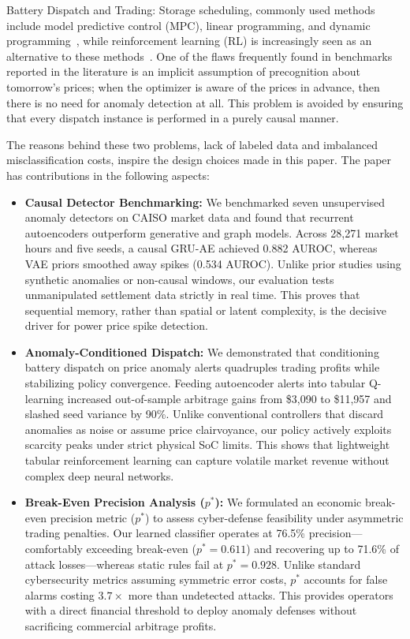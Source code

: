 \documentclass[journal]{IEEEtran}
\begin{document}
Battery Dispatch and Trading: Storage scheduling, commonly used methods include model predictive control (MPC), linear programming, and dynamic programming~\cite{Shi_BESS_Coopt}, while reinforcement learning (RL) is increasingly seen as an alternative to these methods~\cite{RL_Dispatch, Chen_DRL_BESS, Sutton_RL}. One of the flaws frequently found in benchmarks reported in the literature is an implicit assumption of precognition about tomorrow's prices; when the optimizer is aware of the prices in advance, then there is no need for anomaly detection at all. This problem is avoided by ensuring that every dispatch instance is performed in a purely causal manner.

The reasons behind these two problems, lack of labeled data and imbalanced misclassification costs, inspire the design choices made in this paper. The paper has contributions in the following aspects:
\begin{itemize}
\item \textbf{Causal Detector Benchmarking:} We benchmarked seven unsupervised anomaly detectors on CAISO market data and found that recurrent autoencoders outperform generative and graph models. Across 28,271 market hours and five seeds, a causal GRU-AE achieved 0.882 AUROC, whereas VAE priors smoothed away spikes (0.534 AUROC). Unlike prior studies using synthetic anomalies or non-causal windows, our evaluation tests unmanipulated settlement data strictly in real time. This proves that sequential memory, rather than spatial or latent complexity, is the decisive driver for power price spike detection.
\item \textbf{Anomaly-Conditioned Dispatch:} We demonstrated that conditioning battery dispatch on price anomaly alerts quadruples trading profits while stabilizing policy convergence. Feeding autoencoder alerts into tabular Q-learning increased out-of-sample arbitrage gains from \$3,090 to \$11,957 and slashed seed variance by 90\%. Unlike conventional controllers that discard anomalies as noise or assume price clairvoyance, our policy actively exploits scarcity peaks under strict physical SoC limits. This shows that lightweight tabular reinforcement learning can capture volatile market revenue without complex deep neural networks.
\item \textbf{Break-Even Precision Analysis ($p^*$):} We formulated an economic break-even precision metric ($p^*$) to assess cyber-defense feasibility under asymmetric trading penalties. Our learned classifier operates at 76.5\% precision—comfortably exceeding break-even ($p^* = 0.611$) and recovering up to 71.6\% of attack losses—whereas static rules fail at $p^* = 0.928$. Unlike standard cybersecurity metrics assuming symmetric error costs, $p^*$ accounts for false alarms costing $3.7\times$ more than undetected attacks. This provides operators with a direct financial threshold to deploy anomaly defenses without sacrificing commercial arbitrage profits.
\end{itemize}
\end{document}

